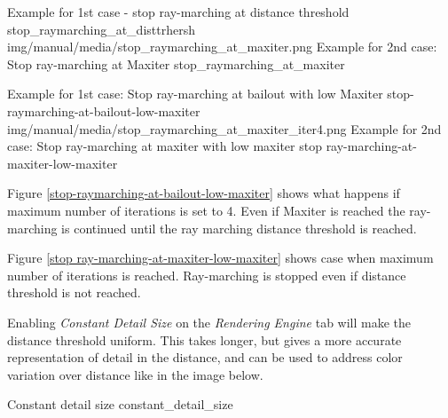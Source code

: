 {Example for 1st case - stop ray-marching at distance threshold}
{stop_raymarching_at_disttrhersh}
{img/manual/media/stop_raymarching_at_maxiter.png}
{Example for 2nd case: Stop ray-marching at Maxiter}
{stop_raymarching_at_maxiter}

{Example for 1st case: Stop ray-marching at bailout with low Maxiter}
{stop-raymarching-at-bailout-low-maxiter}
{img/manual/media/stop_raymarching_at_maxiter_iter4.png}
{Example for 2nd case: Stop ray-marching at maxiter with low maxiter}
{stop ray-marching-at-maxiter-low-maxiter}

Figure \ref{stop-raymarching-at-bailout-low-maxiter} shows what happens if maximum number of iterations is set to 4. Even if Maxiter is reached the
ray-marching is continued until the ray marching distance threshold is reached.

Figure \ref{stop ray-marching-at-maxiter-low-maxiter} shows case when maximum number of iterations is reached. Ray-marching is stopped even
if distance threshold is not reached.

Enabling \emph{Constant Detail Size} on the \emph{Rendering Engine} tab will make the distance threshold uniform. This takes longer, but gives a more accurate representation of detail in the distance, and can be used to address color variation over distance like in the image below.

{Constant detail size}
{constant_detail_size}


